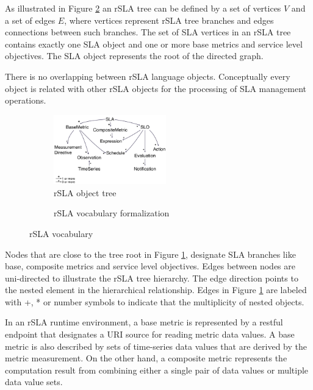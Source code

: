 As illustrated in Figure \ref{rslagraph} an rSLA tree can be defined by a set of vertices $V$ and a set of edges $E$, where vertices represent rSLA tree branches and edges connections between such branches. The set of SLA vertices in an rSLA tree contains exactly one SLA object and one or more base metrics and service level objectives. The SLA object represents the root of the directed graph. 

There is no overlapping between rSLA language objects. Conceptually every object is related with other rSLA objects for the processing of SLA management operations. 

\begin{figure}
        \centering
        \begin{subfigure}{5cm}
                \includegraphics[height=3cm]{pics/rslaobject}
                \caption{rSLA object tree}
                \label{rslaobject}
        \end{subfigure}%
        \begin{subfigure}{5cm}
                \caption{rSLA vocabulary formalization}
                \label{rslagraph}
        \end{subfigure}
        \caption{rSLA vocabulary}\label{treegraph}
\end{figure}

Nodes that are close to the tree root in Figure \ref{rslaobject}, designate SLA branches like base, composite metrics and service level objectives. Edges between nodes are uni-directed to illustrate the rSLA tree hierarchy. The edge direction points to the nested element in the hierarchical relationship. 
Edges in Figure \ref{rslaobject} are labeled with +, * or number symbols to indicate that the multiplicity of nested objects. 

In an rSLA runtime environment, a base metric is represented by a restful endpoint that designates a URI source for reading metric data values. A base metric is also described by sets of time-series data values that are derived by the metric measurement. On the other hand, a composite metric represents the computation result from combining either a single pair of data values or multiple data value sets. 

